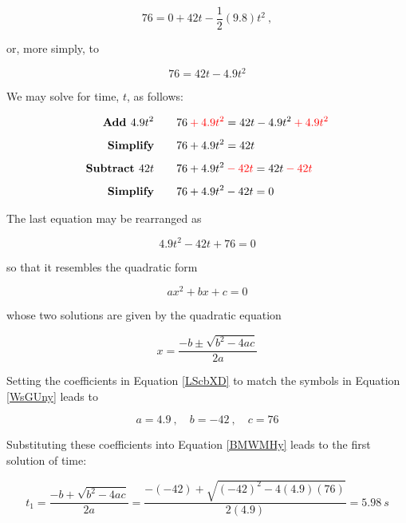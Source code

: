 \documentclass{article}
\begin{document}
\begin{equation*}
    76 =  0 + 42 t -\frac{1}{2}(9.8) t^2\ ,
\end{equation*}

or, more simply, to

\begin{equation*}
    76 = 42 t - 4.9 t^2
\end{equation*}

We may solve for time, $t$, as follows:

\begin{align*}
    \textbf{Add $4.9 t^2$} \qquad & 76 \mathbin{\color{red} +} \textcolor{red}{4.9 t^2} = 42 t - 4.9 t^2 \mathbin{\color{red} +} \textcolor{red}{4.9 t^2}\\[1ex]
    \textbf{Simplify} \qquad & 76 + 4.9 t^2 = 42 t\\[1ex]
    \textbf{Subtract $42 t$} \qquad & 76 + 4.9 t^2 \mathbin{\color{red} -} \textcolor{red}{42 t} = 42 t \mathbin{\color{red} -} \textcolor{red}{42 t}\\[1ex]
    \textbf{Simplify} \qquad & 76 + 4.9 t^2 - 42 t = 0
\end{align*}

The last equation may be rearranged as 

\begin{equation} \label{LScbXD}
    4.9 t^2 - 42 t + 76 = 0
\end{equation}

so that it resembles the quadratic form

\begin{equation} \label{WsGUny}
    ax^2 + bx + c = 0
\end{equation}

whose two solutions are given by the quadratic equation

\begin{equation} \label{BMWMHy}
    x = \frac{-b \pm \sqrt{b^2 - 4ac}}{2a}
\end{equation}

Setting the coefficients in Equation \eqref{LScbXD} to match the symbols in Equation \eqref{WsGUny} leads to 

\begin{equation*}
    a = 4.9\ , \quad b = -42\ ,\quad c = 76
\end{equation*}

Substituting these coefficients into Equation \eqref{BMWMHy} leads to the first solution of time:

\begin{equation*}
    t_1 = \frac{-b + \sqrt{b^2 - 4ac}}{2a} = \frac{-(-42) + \sqrt{(-42)^2 - 4 (4.9)(76)}}{2(4.9)} = \SI{5.98}{s}
\end{equation*}
\end{document}
